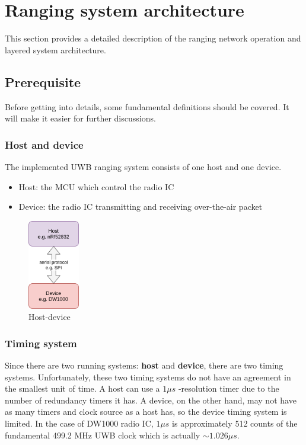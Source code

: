 \documentclass[\main/main.tex]{subfiles}
\begin{document}
\graphicspath{{img/}{03_firmware/img/}}

\chapter{Ranging system architecture}
This section provides a detailed description of the ranging network operation and layered system architecture.

\section{Prerequisite}
Before getting into details, some fundamental definitions should be covered. It will make it easier for further discussions. 

\subsection{Host and device}
The implemented UWB ranging system consists of one host and one device.
\begin{itemize}
    \item Host: the MCU which control the radio IC 
    \item Device: the radio IC transmitting and receiving over-the-air packet
\end{itemize}

\begin{figure}[H]
    \begin{center}
        \includegraphics[width=0.2\textwidth]{host_device.png}
    \end{center}
    \caption{Host-device}
    \label{fig:host_device}
\end{figure}

\subsection{Timing system}
\label{subsec:timing_system_subsection}
Since there are two running systems: \textbf{host} and \textbf{device}, there are two timing systems. Unfortunately, these two timing systems do not have an agreement in the smallest unit of time. A host can use a $1\mu s$ -resolution timer due to the number of redundancy timers it has. A device, on the other hand, may not have as many timers and clock source as a host has, so the device timing system is limited. In the case of DW1000 radio IC, $1\mu s$ is approximately 512 counts of the fundamental 499.2 MHz UWB clock which is actually \textbf{$\sim 1.026\mu s$}. 
\end{document}
